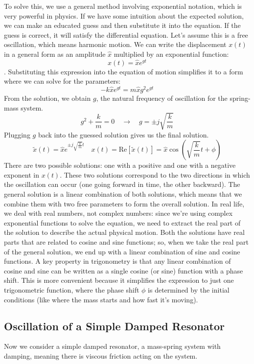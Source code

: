 \documentclass[a4paper]{article}
\begin{document}
To solve this, we use a general method involving exponential notation, which is very powerful in physics. If we have some intuition about the expected solution, we can make an educated guess and then substitute it into the equation. If the guess is correct, it will satisfy the differential equation. Let’s assume this is a free oscillation, which means harmonic motion. We can write the displacement \( x(t) \) in a general form as an amplitude \( \hat{x} \) multiplied by an exponential function: \[x(t) = \hat{x} e^{gt}\]. Substituting this expression into the equation of motion simplifies it to a form where we can solve for the parameters: \[
-k \hat{x} e^{gt} = m \hat{x} g^2 e^{gt}
\]
From the solution, we obtain \( g \), the natural frequency of oscillation for the spring-mass system.
\[
g^2 + \frac{k}{m} = 0 \quad \to \quad g = \pm j \sqrt{\frac{k}{m}}
\]
Plugging \( g \) back into the guessed solution gives us the final solution. \[
\tilde{x}(t) = \hat{x} e^{\pm j \sqrt{\frac{k}{m}}t} \quad
x(t) = \text{Re}[\tilde{x}(t)] = \hat{x} \cos\left(\sqrt{\frac{k}{m}}t + \phi\right)
\]There are two possible solutions: one with a positive and one with a negative exponent in \( x(t) \). These two solutions correspond to the two directions in which the oscillation can occur (one going forward in time, the other backward). The general solution is a linear combination of both solutions, which means that we combine them with two free parameters to form the overall solution. In real life, we deal with real numbers, not complex numbers: since we're using complex exponential functions to solve the equation, we need to extract the real part of the solution to describe the actual physical motion. Both the solutions have real parts that are related to cosine and sine functions; so, when we take the real part of the general solution, we end up with a linear combination of sine and cosine functions. A key property in trigonometry is that any linear combination of cosine and sine can be written as a single cosine (or sine) function with a phase shift. This is more convenient because it simplifies the expression to just one trigonometric function, where the phase shift \( \phi \) is determined by the initial conditions (like where the mass starts and how fast it's moving).

\subsection{Oscillation of a Simple Damped Resonator}

Now we consider a simple damped resonator, a mass-spring system with damping, meaning there is viscous friction acting on the system.
\end{document}
